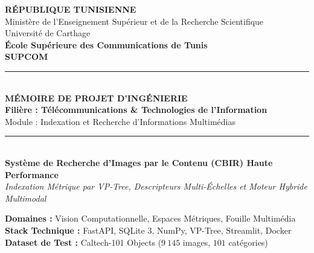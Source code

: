 \documentclass[11pt,a4paper,oneside]{report}
\theoremstyle{definition}
\begin{document}

\begin{titlepage}
    \begin{center}
        \vspace*{-1.0cm}
        {\large \textbf{RÉPUBLIQUE TUNISIENNE}}\\[0.15cm]
        {\small Ministère de l'Enseignement Supérieur et de la Recherche Scientifique}\\[0.15cm]
        {\small Université de Carthage}\\[0.3cm]
        
        \vspace{0.2cm}
        {\Large \textbf{\textcolor{supcomBlue}{École Supérieure des Communications de Tunis}}}\\[0.15cm]
        {\large \textbf{SUPCOM}}\\[0.4cm]
        
        \rule{\linewidth}{1.0pt}\\[0.3cm]
        {\LARGE \textbf{\textcolor{supcomBlue}{MÉMOIRE DE PROJET D'INGÉNIERIE}}}\\[0.2cm]
        {\normalsize \textbf{Filière : Télécommunications \& Technologies de l'Information}}\\[0.15cm]
        {\small Module : Indexation et Recherche d'Informations Multimédias}\\[0.2cm]
        \rule{\linewidth}{1.0pt}\\[0.8cm]
        
        {\huge \textbf{\textcolor{cbirDark}{Système de Recherche d'Images par le Contenu (CBIR) Haute Performance}}}\\[0.4cm]
        {\Large \textit{Indexation Métrique par VP-Tree, Descripteurs Multi-Échelles et Moteur Hybride Multimodal}}\\[0.8cm]
        
        \begin{tcolorbox}[colback=codeBackground, colframe=supcomBlue, width=0.92\linewidth, arc=2mm]
            \centering\small
            \textbf{Domaines :} Vision Computationnelle, Espaces Métriques, Fouille Multimédia\\
            \textbf{Stack Technique :} FastAPI, SQLite 3, NumPy, VP-Tree, Streamlit, Docker\\
            \textbf{Dataset de Test :} Caltech-101 Objects ($9~145$ images, $101$ catégories)
        \end{tcolorbox}
        

\end{center}
\end{titlepage}
\end{document}
